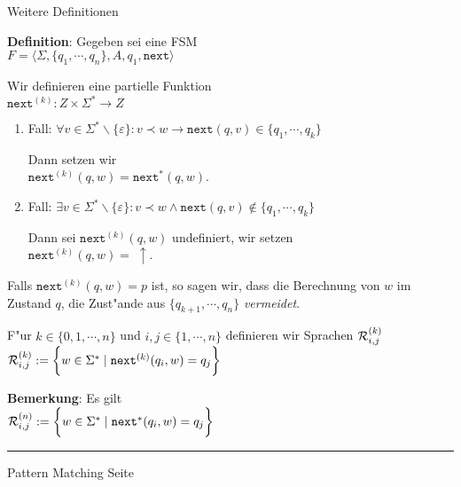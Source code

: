 
\begin{slide}{}
\normalsize

\begin{center}
Weitere Definitionen
\end{center}
\vspace*{0.5cm}

\footnotesize
\textbf{Definition}: Gegeben sei eine FSM \\[0.3cm]
\hspace*{1.3cm} $F = \langle \Sigma, \{q_1,\cdots,q_n\}, A, q_1, \mathtt{next}  \rangle$ 

Wir definieren eine partielle Funktion \\[0.3cm]
\hspace*{1.3cm} $\mathtt{next}^{(k)}: Z \times \Sigma^* \rightarrow Z$
\begin{enumerate}
\item Fall: $\forall v \in \Sigma^*\backslash \{\varepsilon\}: v \prec w \rightarrow \mathtt{next}(q,v) \in \{q_1,\cdots,q_k\}$

      Dann setzen wir \\[0.3cm]
      \hspace*{1.3cm} $\mathtt{next}^{(k)}(q, w) = \mathtt{next}^*(q,w)$.
\item Fall: $\exists v \in \Sigma^*\backslash \{\varepsilon\}:  v \prec w \wedge \mathtt{next}(q,v) \not\in \{q_1,\cdots,q_k\}$

      Dann sei $\mathtt{next}^{(k)}(q, w)$ undefiniert, wir setzen \\[0.3cm]
      \hspace*{1.3cm} $\mathtt{next}^{(k)}(q, w) =\; \uparrow$.
\end{enumerate}
Falls $\mathtt{next}^{(k)}(q,w) = p$ ist, so sagen wir, dass die Berechnung
von $w$ im Zustand $q$, die Zust"ande aus $\{q_{k+1}, \cdots, q_n\}$ \emph{vermeidet}.

F"ur $k \in \{0,1,\cdots,n\}$ und $i,j\in \{1,\cdots,n\}$ 
definieren wir Sprachen ${\cal R}_{i,j}^{(k)}$ \\[0.3cm]
\hspace*{1.3cm} ${\cal R}_{i,j}^{(k)} := \bigg\{ w \in \Sigma^* \;|\; \mathtt{next}^{(k)}(q_i,w) = q_j \bigg\}$

\textbf{Bemerkung}: Es gilt \\[0.3cm]
\hspace*{1.3cm} ${\cal R}_{i,j}^{(n)} := \bigg\{ w \in \Sigma^* \;|\; \mathtt{next}^*(q_i,w) = q_j \bigg\}$

\vspace*{\fill}
\tiny \addtocounter{mypage}{1}
\rule{17cm}{1mm}
Pattern Matching \hspace*{\fill} Seite 
\end{slide}

